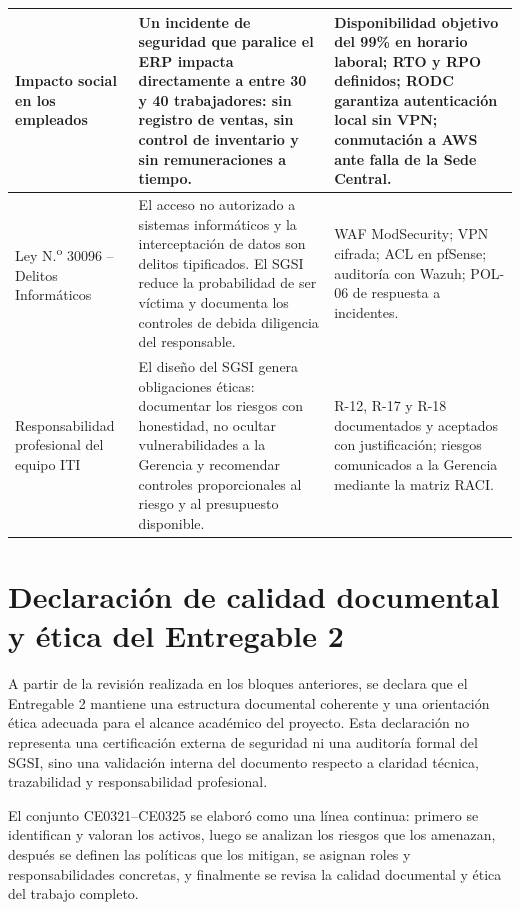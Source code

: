 \documentclass[11pt, a4paper, oneside]{report}
\begin{document}
\begin{xltabular}{\textwidth}{@{}|L{3.8cm}|X|L{4cm}|@{}}
{\small Impacto social en los empleados} & {\small Un incidente de seguridad que paralice el ERP impacta directamente a entre 30 y 40 trabajadores: sin registro de ventas, sin control de inventario y sin remuneraciones a tiempo.} & {\small Disponibilidad objetivo del 99\% en horario laboral; RTO y RPO definidos; RODC garantiza autenticación local sin VPN; conmutación a AWS ante falla de la Sede Central.} \\ \hline

{\small Ley N.\textsuperscript{o} 30096 -- Delitos Informáticos \citep{ley30096}} & {\small El acceso no autorizado a sistemas informáticos y la interceptación de datos son delitos tipificados. El SGSI reduce la probabilidad de ser víctima y documenta los controles de debida diligencia del responsable.} & {\small WAF ModSecurity; VPN cifrada; ACL en pfSense; auditoría con Wazuh; POL-06 de respuesta a incidentes.} \\ \hline

{\small Responsabilidad profesional del equipo ITI} & {\small El diseño del SGSI genera obligaciones éticas: documentar los riesgos con honestidad, no ocultar vulnerabilidades a la Gerencia y recomendar controles proporcionales al riesgo y al presupuesto disponible.} & {\small R-12, R-17 y R-18 documentados y aceptados con justificación; riesgos comunicados a la Gerencia mediante la matriz RACI.} \\ \hline

\end{xltabular}

\normalsize

\section{Declaración de calidad documental y ética del Entregable 2}

A partir de la revisión realizada en los bloques anteriores, se declara que el Entregable 2 mantiene una estructura documental coherente y una orientación ética adecuada para el alcance académico del proyecto. Esta declaración no representa una certificación externa de seguridad ni una auditoría formal del SGSI, sino una validación interna del documento respecto a claridad técnica, trazabilidad y responsabilidad profesional.

El conjunto CE0321--CE0325 se elaboró como una línea continua: primero se identifican y valoran los activos, luego se analizan los riesgos que los amenazan, después se definen las políticas que los mitigan, se asignan roles y responsabilidades concretas, y finalmente se revisa la calidad documental y ética del trabajo completo.
\end{document}
